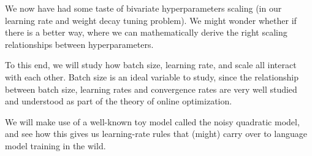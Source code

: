 \clearpage
{}

We now have had some taste of bivariate hyperparameters scaling (in our learning rate and weight decay tuning problem). We might wonder whether if there is a better way, where we can mathematically derive the right scaling relationships between hyperparameters.

To this end, we will study how batch size, learning rate, and scale all interact with each other. Batch size is an ideal variable to study, since the relationship between batch size, learning rates and convergence rates are very well studied and understood as part of the theory of online optimization.

We will make use of a well-known toy model called the noisy quadratic model, and see how this gives us learning-rate rules that (might) carry over to language model training in the wild.

\begingroup
\setcounter{question}{0}
\renewcommand{\aTwoProblemNumber}{3.\arabic{question}}



\endgroup
\setcounter{question}{3}


